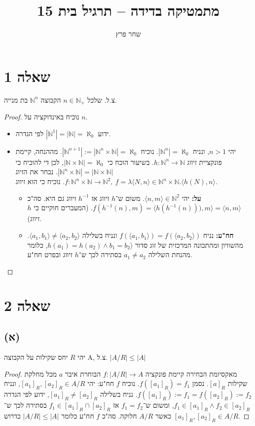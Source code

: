 \documentclass[]{article}
\title{מתמטיקה בדידה – תרגיל בית 15}
\author{שחר פרץ}
\newcommand\N     {\mathbb{N}}
\newcommand\ra    {\rangle}
\newcommand\la    {\langle}
\newcommand\az    {\aleph_0}
\begin{document}
	\maketitle
	
	\section*{שאלה 1}
	צ.ל. שלכל $n \in \N_+$ הקבוצה $\N^n$ בת מנייה. 
	\begin{proof} נוכיח באינדוקציה על $n$. 
		\begin{itemize}
			\item ידוע $|\N^1| = |\N| = \az$ לפי הגדרה.
			\item יהי $n > 1$, ונניח $|\N^n| = \az$. נוכיח $|\N^{n + 1}| := |\N^n \times \N| = \az$. מההנחה, קיימת פונקציית זיווג $h \colon \N^n \to \N$. בשיעור הוכח כי $|\N \times \N| = \az$, לכן די להוכיח כי $| \N^n \times \N | = |\N \times \N|$. נבחר את הזיוג $f \colon \N^n \times \N \to \N^2, \ f = \lambda \la N, n \ra \in \N^n \times \N. \la h(N), n \ra$. נוכיח כי הוא זיווג. 
			\begin{itemize}
				\item \textbf{על: }יהי $\la n, m \ra \in \N^2$. משום ש־$h$ זיווג אז $h^{-1}$ זיווג גם היא. סה"כ $f(h^{-1}(n), m) = \la h(h^{-1}(n))), m \ra = \la n, m \ra $. (המעברים חוקיים כי $h$ זיווג). 
				\item \textbf{חח"ע: }נניח $f(\la a_1, b_1 \ra) = f(\la a_2, b_2 \ra)$ ונניח בשלילה $\la a_1, b_1 \ra \neq \la a_2, b_2 \ra$. מהשוויון ומהתכונה המרכזית של זוג סדור $h(a_1) = h(a_2) \land b_1 = b_2 \ra$, כלומר מהנחת השלילה $a_1 \neq a_2$ בסתירה לכך ש־$h$ זיווג ובפרט חח"ע. 
			\end{itemize}
		\end{itemize}
	\end{proof}
	
	\section*{שאלה 2}
	\subsection*{(א)}
	 יהי $R$ יחס שקילות על הקבוצה A, צ.ל. $|A/R| \le |A|$
	\begin{proof}
		מאקסיומת הבחירה קיימת פונקציה $ f \colon |A / R| \to A $ הבוחרת איבר $ a $ מכל מחלקת שקילות $ [a]_R $. נסמן $ f([a_1]_R) = f_1 $. נוכיח $ f $ חח"ע: יהי $ [a_1]_R, [a_2]_R \in A / R $, ונניח $ f([a_1]_R) := f_1 = f([a_2]_R) := f_2 $. נניח בשלילה $ [a_1]_R \neq [a_2]_R $, ידוע לפי הגדרה $ f_1 \in [a_1]_R \land f_2 \in [a_2]_R $, ומשום ש־$ f_1 = f_2 $ אז $ f_1 \in [a_1]_R \cap [a_2]_R $ בסתירה לכך ש־$ [a_1]_R, [a_2]_R \in A / R $ כאשר $ A / R $ חלוקה. סה"כ $ f $ חח"ע כלומר $ |A / R| \le |A| $ כדרוש. 
	\end{proof}
\end{document}
